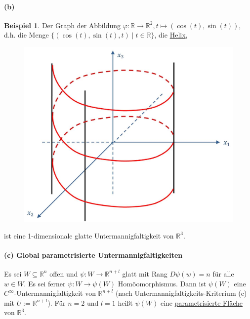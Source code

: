 \documentclass[a4paper,11pt,notitlepage]{report}
\theoremstyle{definition}
\newtheorem{example}{Beispiel}[chapter]
\newcommand{\R}{{\ensuremath{\mathbb{R}}}}
\begin{document}
\paragraph{(b)}
\begin{example}
	Der Graph der Abbildung $\varphi \colon \R \rightarrow \R^2, t \mapsto (\cos{(t)},\sin{(t)})$, d.h. die Menge $\{(\cos{(t)},\sin{(t)},t) \mid t \in \R\}$, die \underline{Helix},
\begin{figure}[h]
	\centering
	\includegraphics[scale=0.4]{images/Helix.jpg}
\end{figure}
 ist eine 1-dimensionale glatte Untermannigfaltigkeit von $\R^3$.
\end{example}

\paragraph{(c) Global parametrisierte Untermannigfaltigkeiten}
Es sei $W \subseteq \R^n$ offen und $\psi \colon W \rightarrow \R^{n+l}$ glatt mit Rang $D\psi(w)=n$ für alle $w \in W$. Es sei ferner $\psi \colon W \rightarrow \psi(W)$ Homöomorphismus.
Dann ist $\psi(W)$ eine $C^\infty$-Untermannigfaltigkeit von $\R^{n+l}$ (nach Untermannigfaltigkeits-Kriterium (c) mit $U := \R^{n+l}$).
\newline
Für $n=2$ und $l=1$ heißt $\psi(W)$ eine \underline{parametrisierte Fläche} von $\R^3$.
\end{document}
